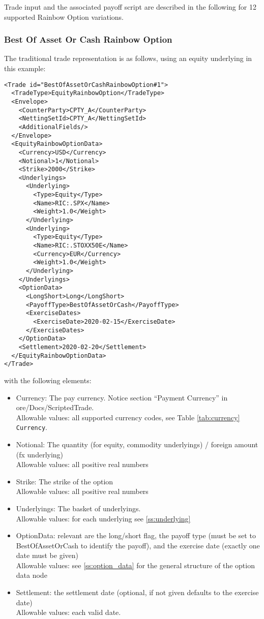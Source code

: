 Trade input and the associated payoff script are described in the following for 12 supported Rainbow Option variations.

\subsubsection*{Best Of Asset Or Cash Rainbow Option}

The traditional trade representation is as follows, using an equity underlying in this example:

\begin{verbatim}
<Trade id="BestOfAssetOrCashRainbowOption#1">
  <TradeType>EquityRainbowOption</TradeType>
  <Envelope>
    <CounterParty>CPTY_A</CounterParty>
    <NettingSetId>CPTY_A</NettingSetId>
    <AdditionalFields/>
  </Envelope>
  <EquityRainbowOptionData>
    <Currency>USD</Currency>
    <Notional>1</Notional>
    <Strike>2000</Strike>
    <Underlyings>
      <Underlying>
        <Type>Equity</Type>
        <Name>RIC:.SPX</Name>
        <Weight>1.0</Weight>
      </Underlying>
      <Underlying>
        <Type>Equity</Type>
        <Name>RIC:.STOXX50E</Name>
        <Currency>EUR</Currency>
        <Weight>1.0</Weight>
      </Underlying>
    </Underlyings>
    <OptionData>
      <LongShort>Long</LongShort>
      <PayoffType>BestOfAssetOrCash</PayoffType>
      <ExerciseDates>
        <ExerciseDate>2020-02-15</ExerciseDate>
      </ExerciseDates>
    </OptionData>
    <Settlement>2020-02-20</Settlement>
  </EquityRainbowOptionData>
</Trade>
\end{verbatim}

with the following elements:

\begin{itemize}
\item Currency: The pay currency. Notice section ``Payment Currency'' in ore/Docs/ScriptedTrade. \\
  Allowable values: all supported currency codes, see Table \ref{tab:currency} \lstinline!Currency!.
\item Notional: The quantity (for equity, commodity underlyings) / foreign amount (fx underlying) \\
  Allowable values: all positive real numbers
\item Strike: The strike of the option \\
  Allowable values: all positive real numbers
\item Underlyings: The basket of underlyings. \\
  Allowable values: for each underlying see \ref{ss:underlying}
\item OptionData: relevant are the long/short flag, the payoff type (must be set to BestOfAssetOrCash to
  identify the payoff), and the exercise date (exactly one date must be given) \\
  Allowable values: see \ref{ss:option_data} for the general structure of the option data node
\item Settlement: the settlement date (optional, if not given defaults to the exercise date) \\
  Allowable values: each valid date.
\end{itemize}

